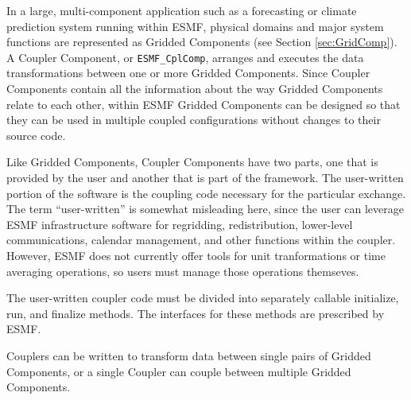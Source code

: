 %

\label{sec:CplComp}

In a large, multi-component application such as a forecasting or 
climate prediction system running within ESMF, physical domains 
and major system functions are represented as Gridded Components 
(see Section \ref{sec:GridComp}).  A Coupler Component, or 
{\tt ESMF\_CplComp}, arranges and executes the data 
transformations between one or more Gridded Components.  Since
Coupler Components contain all the information about the way
Gridded Components relate to each other, within ESMF Gridded 
Components can be designed so that they can be used in multiple 
coupled configurations without changes to their source code. 

Like Gridded Components, Coupler Components have two parts, one
that is provided by the user and another that is part of the 
framework.  The user-written portion of the software is the coupling
code necessary for the particular exchange.  The term ``user-written'' 
is somewhat misleading here, since the user can leverage 
ESMF infrastructure software for regridding, redistribution,
lower-level communications, calendar management, and other functions 
within the coupler.  However, ESMF does not currently offer tools for
unit tranformations or time averaging operations, so users must 
manage those operations themseves.

The user-written coupler code must be divided into separately callable 
initialize, run, and finalize methods.  The interfaces for these 
methods are prescribed by ESMF.

Couplers can be written to transform data between single pairs of 
Gridded Components, or a single Coupler can couple between multiple 
Gridded Components.


